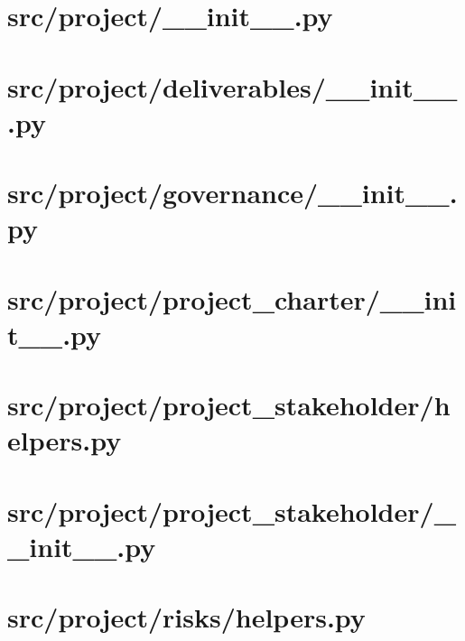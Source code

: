 \UseRawInputEncoding

\section{src/project/\_\_init\_\_.py}


\pagebreak

\section{src/project/deliverables/\_\_init\_\_.py}


\pagebreak

\section{src/project/governance/\_\_init\_\_.py}


\pagebreak

\section{src/project/project\_charter/\_\_init\_\_.py}


\pagebreak

\section{src/project/project\_stakeholder/helpers.py}


\pagebreak

\section{src/project/project\_stakeholder/\_\_init\_\_.py}


\pagebreak

\section{src/project/risks/helpers.py}


\pagebreak

